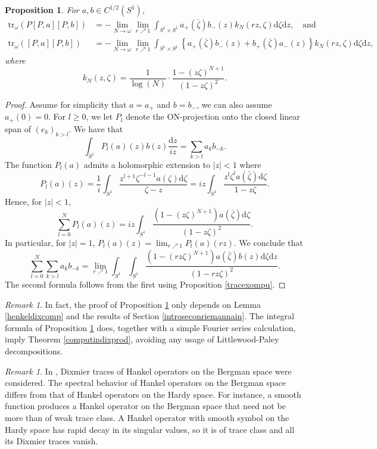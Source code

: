 \documentclass[10pt]{amsart}
\newtheorem{prop}[thm]{Proposition}
\theoremstyle{remark}
\newtheorem{remark}[thm]{Remark}
\theoremstyle{definition}
\begin{document}
\begin{prop}
\label{inteformcirc}
For $a,b\in C^{1/2}(S^1)$,
\begin{align*}
{\mathrm{t}\mathrm{r}}_\omega(P[P,a][P,b])&=-\lim_{N\to \omega} \lim_{r\nearrow 1}\int_{S^1\times S^1} a_+(\bar{\zeta})b_-(z)k_N(rz,\zeta){\mathrm{d}} \zeta{\mathrm{d}} z,\quad\mbox{and}\\
{\mathrm{t}\mathrm{r}}_\omega([P,a][P,b])&=-\lim_{N\to \omega} \lim_{r\nearrow 1}\int_{S^1\times S^1} \left\{a_+(\bar{\zeta})b_-(z)+b_+(\bar{\zeta})a_-(z)\right\}k_N(rz,\zeta){\mathrm{d}} \zeta{\mathrm{d}} z,
\end{align*}
where
$$k_N(z,\zeta)=\frac{1}{\log (N)}\cdot \frac{1-(z\zeta)^{N+1}}{(1-z\zeta)^2}.$$
\end{prop}

\begin{proof}
Assume for simplicity that $a=a_+$ and $b=b_-$, we can also assume $a_+(0)=0$. For $l\geq 0$, we let $P_l$ denote the ON-projection onto the closed linear span of $(e_k)_{k> l}$. We have that
$$\int_{S^1} P_l(a)(z) b(z)\frac{{\mathrm{d}} z}{iz}=\sum_{k>l} a_kb_{-k}.$$
The function $P_l(a)$ admits a holomorphic extension to $|z|<1$ where
$$P_l(a)(z)=\frac{1}{i}\int_{S^1}\frac{z^{l+1}\zeta^{-l-1}a(\zeta){\mathrm{d}} \zeta}{\zeta-z}=iz\int_{S^1}\frac{z^{l}\zeta^{l}a(\bar{\zeta}){\mathrm{d}} \zeta}{1-z\zeta}.$$
Hence, for $|z|<1$,
$$\sum_{l=0}^NP_l(a)(z)=iz\int_{S^1}\frac{(1-(z\zeta)^{N+1})a(\bar{\zeta}){\mathrm{d}} \zeta}{(1-z\zeta)^2}.$$
In particular, for $|z|=1$, $P_l(a)(z)=\lim_{r\nearrow 1}P_l(a)(rz)$. We conclude that
$$\sum_{l=0}^N \sum_{k>l} a_kb_{-k}=\lim_{r\nearrow 1}\int_{S^1}\int_{S^1}\frac{(1-(rz\zeta)^{N+1})a(\bar{\zeta})b(z){\mathrm{d}} \zeta{\mathrm{d}} z}{(1-rz\zeta)^2}.$$
The second formula follows from the first using Proposition \ref{tracexompu}.
\end{proof}

\begin{remark}
In fact, the proof of Proposition \ref{inteformcirc} only depends on Lemma \ref{henkeldixcomp} and the results of Section \ref{introseconriemannain}. The integral formula of Proposition \ref{inteformcirc} does, together with a simple Fourier series calculation, imply Theorem \ref{computindixprod}, avoiding any usage of Littlewood-Paley decompositions.
\end{remark}

\begin{remark}
In \cite{engroch}, Dixmier traces of Hankel operators on the Bergman space were considered. The spectral behavior of Hankel operators on the Bergman space differs from that of Hankel operators on the Hardy space. For instance, a smooth function produces a Hankel operator on the Bergman space that need not be more than of weak trace class. A Hankel operator with smooth symbol on the Hardy space has rapid decay in its singular values, so it is of trace class and all its Dixmier traces vanish.
\end{remark}
\end{document}
